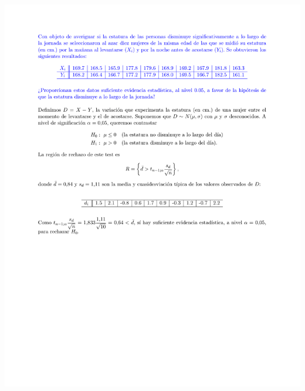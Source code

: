 \newpage
\begin{problem}[3]
\solution
\centerline{\includegraphics[page=1,scale=0.8328]{pdf/_Solucion_T5_a_P3.pdf}} %
\end{problem}

\newpage

